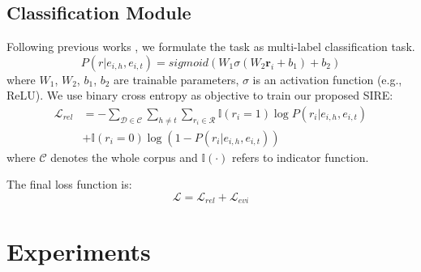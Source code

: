 \documentclass[11pt,a4paper]{article}
\begin{document}
\subsection{Classification Module\label{ssec:classification}}
Following previous works \citep{DocRED-paper,GAIN}, we formulate the task as multi-label classification task.
\begin{equation}
    P(r|e_{i,h}, e_{i,t}) = sigmoid \left(W_1 \sigma (W_2 \textbf{r}_{i} + b_1) + b_2 \right)
\end{equation}
where $W_1$, $W_2$, $b_1$, $b_2$ are trainable parameters, $\sigma$ is an activation function (e.g., ReLU). We use binary cross entropy as objective to train our proposed SIRE:
\begin{equation}
\begin{split}
    \mathcal{L}_{rel} &= - \sum _{\mathcal{D} \in \mathcal{C}}  \sum _{h\neq t} \sum_{r_i \in \mathcal{R}}  \mathbb I \left ( r_i=1 \right ) \log P \left ( r_i|e_{i,h}, e_{i,t} \right )
    \\
     & +  \mathbb I \left ( r_i=0 \right ) \log \left(  1 - P \left ( r_i|e_{i,h}, e_{i,t} \right ) \right )
\end{split}
\end{equation}
where $\mathcal{C}$ denotes the whole corpus and $\mathbb I\left(\cdot\right)$ refers to indicator function.

The final loss function is:
\begin{equation}
    \mathcal{L} = \mathcal{L}_{rel} + \mathcal{L}_{evi}
\end{equation}
\fi \section{Experiments}
\end{document}
